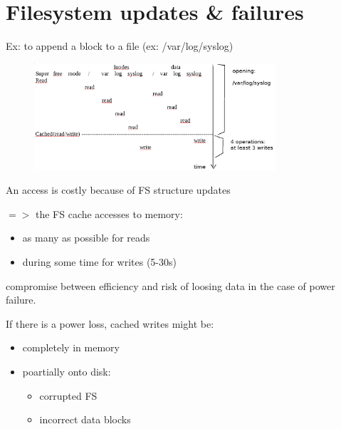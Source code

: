 \section{Filesystem updates \& failures}

Ex: to append a block to a file (ex: /var/log/syslog)
\vspace{1cm}
\begin{figure}[h!]
  \begin{center}
    \includegraphics[width=0.8\textwidth]{fs_updates_failures.png}
  \end{center}
\end{figure}


An access is costly because of FS structure updates

$=>$ the FS cache accesses to memory:
\begin{itemize}
  \item as many as possible for reads
  \item during some time for writes (5-30s)
\end{itemize}
compromise between efficiency and risk of loosing data in the case of power failure.

If there is a power loss, cached writes might be:

\begin{itemize}
  \item completely in memory
  \item poartially onto disk:
    \begin{itemize}
      \item corrupted FS
      \item incorrect data blocks
    \end{itemize}
\end{itemize}
